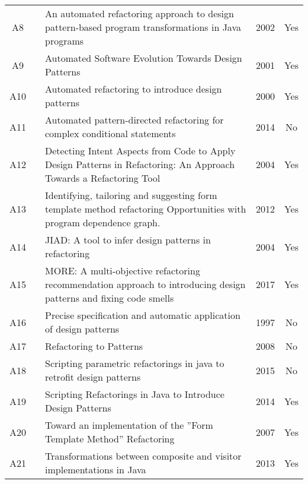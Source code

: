 \begin{longtable}{cp{3cm}p{8cm}cc}
A8  & \citeauthor*{sang1183003}              & An automated refactoring approach to design pattern-based program transformations in Java programs                  & 2002 & Yes      \\
A9  & \citeauthor*{Cinneide602499}           & Automated Software Evolution Towards Design Patterns                                                                & 2001 & Yes      \\
A10 & \citeauthor*{cinneide337612}           & Automated refactoring to introduce design patterns                                                                  & 2000 & Yes      \\
A11 & \citeauthor*{Liu2014}                  & Automated pattern-directed refactoring for complex conditional statements                                           & 2014 & No       \\
A12 & \citeauthor*{ram2004detecting}         & Detecting Intent Aspects from Code to Apply Design Patterns in Refactoring: An Approach Towards a Refactoring Tool  & 2004 & Yes      \\
A13 & \citeauthor*{hotta6178876}             & Identifying, tailoring and suggesting form template method refactoring Opportunities with program dependence graph. & 2012 & Yes      \\
A14 & \citeauthor*{rajesh1013988}            & JIAD: A tool to infer design patterns in refactoring                                                                & 2004 & Yes      \\
A15 & \citeauthor*{ouni2017more}             & MORE: A multi-objective refactoring recommendation approach to introducing design patterns and fixing code smells   & 2017 & Yes      \\
A16 & \citeauthor*{eden632834}               & Precise specification and automatic application of design patterns                                                  & 1997 & No       \\
A17 & \citeauthor*{kerievsky2005refactoring} & Refactoring to Patterns                                                                                             & 2008 & No       \\
A18 & \citeauthor*{kim7332467}               & Scripting parametric refactorings in java to retrofit design patterns                                               & 2015 & No       \\
A19 & \citeauthor*{kim2014scripting}         & Scripting Refactorings in Java to Introduce Design Patterns                                                         & 2014 & Yes      \\
A20 & \citeauthor*{juillerat4362900}         & Toward an implementation of the ”Form Template Method” Refactoring                                                  & 2007 & Yes      \\
A21 & \citeauthor*{ajouli6619484}            & Transformations between composite and visitor implementations in Java                                               & 2013 & Yes     
\end{longtable}
\FloatBarrier